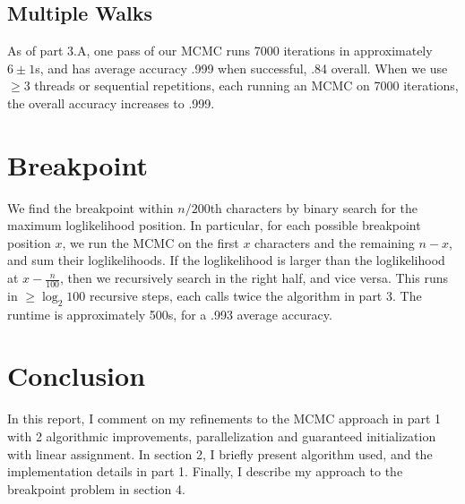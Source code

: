 \documentclass[aps,prd,final,twocolumn,letterpaper]{revtex4}
\begin{document}
\subsection{Multiple Walks}
As of part 3.A, one pass of our MCMC runs 7000 iterations in approximately $6\pm 1$s, and has average accuracy .999 when successful, .84 overall. When we use $\geq 3$ threads or sequential repetitions, each running an MCMC on 7000 iterations, the overall accuracy increases to .999.



\section{Breakpoint}
We find the breakpoint within $n/200$th characters by binary search for the maximum loglikelihood position. In particular, for each possible breakpoint position $x$, we run the MCMC on the first $x$ characters and the remaining $n-x$, and sum their loglikelihoods. If the loglikelihood is larger than the loglikelihood at $x-\frac{n}{100}$, then we recursively search in the right half, and vice versa. This runs in $\geq \log_2 100$ recursive steps, each calls twice the algorithm in part 3. The runtime is approximately 500s, for a .993 average accuracy.

\section{Conclusion}
In this report, I comment on my refinements to the MCMC approach in part 1 with 2 algorithmic improvements, parallelization and guaranteed initialization with linear assignment. In section 2, I briefly present algorithm used, and the implementation details in part 1. Finally, I describe my approach to the breakpoint problem in section 4.
\end{document}
